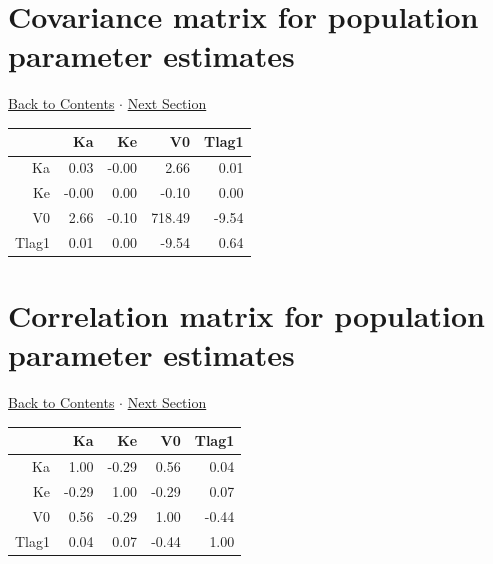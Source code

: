 \documentclass{article}
\begin{document}
          \hypertarget{covforppe}{}
          
          \section{Covariance matrix for population parameter estimates} 
 \hyperlink{tableofcontents}{Back to Contents} $\cdot$ \hyperlink{corforppe}{Next Section} \newline
          \newline 
\begin{tabular}{rrrrr}
  \hline
 & Ka & Ke & V0 & Tlag1 \\ 
  \hline
Ka & 0.03 & -0.00 & 2.66 & 0.01 \\ 
  Ke & -0.00 & 0.00 & -0.10 & 0.00 \\ 
  V0 & 2.66 & -0.10 & 718.49 & -9.54 \\ 
  Tlag1 & 0.01 & 0.00 & -9.54 & 0.64 \\ 
   \hline
\end{tabular}

          \hypertarget{corforppe}{}
          
          \section{Correlation matrix for population parameter estimates} 
 \hyperlink{tableofcontents}{Back to Contents} $\cdot$ \hyperlink{opp}{Next Section} \newline
          \newline 
\begin{tabular}{rrrrr}
  \hline
 & Ka & Ke & V0 & Tlag1 \\ 
  \hline
Ka & 1.00 & -0.29 & 0.56 & 0.04 \\ 
  Ke & -0.29 & 1.00 & -0.29 & 0.07 \\ 
  V0 & 0.56 & -0.29 & 1.00 & -0.44 \\ 
  Tlag1 & 0.04 & 0.07 & -0.44 & 1.00 \\ 
   \hline
\end{tabular}
\newpage
        
        \hypertarget{opp}{}
        
\end{document}
